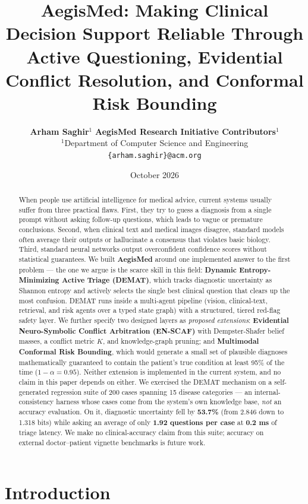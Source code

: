 \documentclass[10pt,twocolumn]{article}
\title{\textbf{AegisMed: Making Clinical Decision Support Reliable Through Active Questioning, Evidential Conflict Resolution, and Conformal Risk Bounding}}
\author{
    \textbf{Arham Saghir}$^{1}$ \quad \textbf{AegisMed Research Initiative Contributors}$^{1}$ \\
    $^{1}$Department of Computer Science and Engineering \\
    \texttt{\{arham.saghir\}@acm.org}
}
\date{October 2026}
\begin{document}
\maketitle

\begin{abstract}
\noindent When people use artificial intelligence for medical advice, current systems usually suffer from three practical flaws. First, they try to guess a diagnosis from a single prompt without asking follow-up questions, which leads to vague or premature conclusions. Second, when clinical text and medical images disagree, standard models often average their outputs or hallucinate a consensus that violates basic biology. Third, standard neural networks output overconfident confidence scores without statistical guarantees. We built \textbf{AegisMed} around one implemented answer to the first problem --- the one we argue is the scarce skill in this field:
\textbf{Dynamic Entropy-Minimizing Active Triage (DEMAT)}, which tracks diagnostic uncertainty as Shannon entropy and actively selects the single best clinical question that clears up the most confusion. DEMAT runs inside a multi-agent pipeline (vision, clinical-text, retrieval, and risk agents over a typed state graph) with a structured, tiered red-flag safety layer. We further specify two designed layers as \emph{proposed extensions}: \textbf{Evidential Neuro-Symbolic Conflict Arbitration (EN-SCAF)} with Dempster-Shafer belief masses, a conflict metric $K$, and knowledge-graph pruning; and \textbf{Multimodal Conformal Risk Bounding}, which would generate a small set of plausible diagnoses mathematically guaranteed to contain the patient's true condition at least 95\% of the time ($1 - \alpha = 0.95$). Neither extension is implemented in the current system, and no claim in this paper depends on either. We exercised the DEMAT mechanism on a self-generated regression suite of 200 cases spanning 15 disease categories --- an internal-consistency harness whose cases come from the system's own knowledge base, \emph{not} an accuracy evaluation. On it, diagnostic uncertainty fell by \textbf{53.7\%} (from 2.846 down to 1.318 bits) while asking an average of only \textbf{1.92 questions per case} at \textbf{0.2 ms} of triage latency. We make no clinical-accuracy claim from this suite; accuracy on external doctor--patient vignette benchmarks is future work.
\end{abstract}

\section{Introduction}
\end{document}
